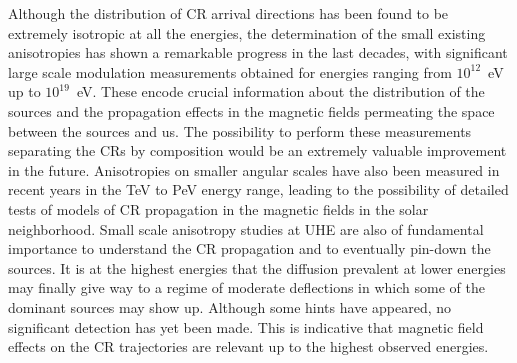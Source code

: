 \documentclass[twoside,12pt]{article}
\begin{document}
Although the distribution of CR arrival directions has been found to be extremely isotropic at all the energies, the determination of the small existing anisotropies has shown a remarkable progress in the last decades, with significant large scale modulation measurements obtained for energies ranging from $10^{12}$~eV up to $10^{19}$~eV. These encode crucial information about the distribution of the sources and the propagation effects in the magnetic fields permeating the space between the sources and us. The possibility to perform these measurements separating the CRs by composition would be an extremely valuable improvement in the future. Anisotropies on smaller angular scales  have also been measured in recent years in the TeV to PeV energy range, leading to the possibility of detailed tests of models of CR propagation in the magnetic fields in the solar neighborhood. Small scale anisotropy studies at UHE are also of fundamental importance to understand the CR propagation and to eventually pin-down the sources. It is at the highest energies that the diffusion prevalent at lower energies may finally give way to a regime of moderate deflections in which some of the dominant sources may show up. Although some hints have appeared, no significant detection has yet been made. This is indicative that magnetic field effects on the CR trajectories are relevant up to the highest observed energies.
\end{document}
